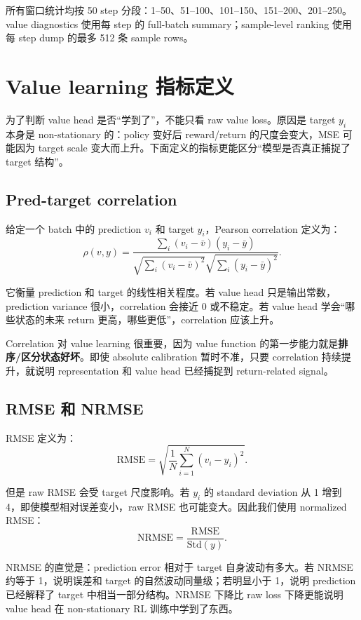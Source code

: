 \documentclass[10pt]{ctexart}
\begin{document}
所有窗口统计均按 50 step 分段：1--50、51--100、101--150、151--200、201--250。value diagnostics 使用每 step 的 full-batch summary；sample-level ranking 使用每 step dump 的最多 512 条 sample rows。

\section{Value learning 指标定义}
为了判断 value head 是否“学到了”，不能只看 raw value loss。原因是 target $y_i$ 本身是 non-stationary 的：policy 变好后 reward/return 的尺度会变大，MSE 可能因为 target scale 变大而上升。下面定义的指标更能区分“模型是否真正捕捉了 target 结构”。

\subsection{Pred-target correlation}
给定一个 batch 中的 prediction $v_i$ 和 target $y_i$，Pearson correlation 定义为：
\begin{equation}
  \rho(v,y) = \frac{\sum_i (v_i - \bar v)(y_i - \bar y)}{\sqrt{\sum_i (v_i - \bar v)^2}\sqrt{\sum_i (y_i - \bar y)^2}}.
\end{equation}

它衡量 prediction 和 target 的线性相关程度。若 value head 只是输出常数，prediction variance 很小，correlation 会接近 0 或不稳定。若 value head 学会“哪些状态的未来 return 更高，哪些更低”，correlation 应该上升。

Correlation 对 value learning 很重要，因为 value function 的第一步能力就是\textbf{排序/区分状态好坏}。即使 absolute calibration 暂时不准，只要 correlation 持续提升，就说明 representation 和 value head 已经捕捉到 return-related signal。

\subsection{RMSE 和 NRMSE}
RMSE 定义为：
\begin{equation}
  \mathrm{RMSE} = \sqrt{\frac{1}{N}\sum_{i=1}^{N}(v_i-y_i)^2}.
\end{equation}

但是 raw RMSE 会受 target 尺度影响。若 $y_i$ 的 standard deviation 从 1 增到 4，即使模型相对误差变小，raw RMSE 也可能变大。因此我们使用 normalized RMSE：
\begin{equation}
  \mathrm{NRMSE} = \frac{\mathrm{RMSE}}{\mathrm{Std}(y)}.
\end{equation}

NRMSE 的直觉是：prediction error 相对于 target 自身波动有多大。若 NRMSE 约等于 1，说明误差和 target 的自然波动同量级；若明显小于 1，说明 prediction 已经解释了 target 中相当一部分结构。NRMSE 下降比 raw loss 下降更能说明 value head 在 non-stationary RL 训练中学到了东西。
\end{document}
